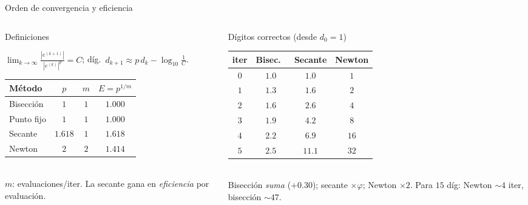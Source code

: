 \documentclass[aspectratio=169,10pt]{beamer}
\begin{document}
\begin{frame}{Orden de convergencia y eficiencia}
\begin{columns}[T]
\begin{column}{0.50\textwidth}
\begin{cardidea}{Definiciones}{\faSuperscript}
{\footnotesize $\displaystyle\lim_{k\to\infty}\frac{|e^{(k+1)}|}{|e^{(k)}|^p}=C$;\; díg.\ $d_{k+1}\approx p\,d_k-\log_{10}\tfrac1C$.\\[1.4mm]
\centering
\renewcommand{\arraystretch}{1.25}\setlength{\tabcolsep}{4pt}
\begin{tabular}{l|ccc}
Método & $p$ & $m$ & $E=p^{1/m}$\\\hline
Bisección & $1$ & $1$ & $1.000$\\
Punto fijo & $1$ & $1$ & $1.000$\\
Secante & $1.618$ & $1$ & $\mathbf{1.618}$\\
Newton & $2$ & $2$ & $1.414$\\
\end{tabular}}\\[1mm]
{\footnotesize $m$: evaluaciones/iter. La secante gana en \emph{eficiencia} por evaluación.}
\end{cardidea}
\end{column}
\begin{column}{0.48\textwidth}
\begin{cardgear}{Dígitos correctos (desde $d_0{=}1$)}{\faTable}
\centering
{\footnotesize\renewcommand{\arraystretch}{1.22}\setlength{\tabcolsep}{6pt}
\begin{tabular}{c|ccc}
iter & Bisec.\ & Secante & Newton\\\hline
$0$&$1.0$&$1.0$&$1$\\
$1$&$1.3$&$1.6$&$2$\\
$2$&$1.6$&$2.6$&$4$\\
$3$&$1.9$&$4.2$&$8$\\
$4$&$2.2$&$6.9$&$16$\\
$5$&$2.5$&$11.1$&$32$\\
\end{tabular}}\\[1mm]
{\footnotesize Bisección \emph{suma} ($+0.30$); secante $\times\varphi$; Newton $\times2$. Para $15$ díg: Newton $\sim4$ iter, bisección $\sim47$.}
\end{cardgear}
\end{column}
\end{columns}
\end{frame}
\end{document}
